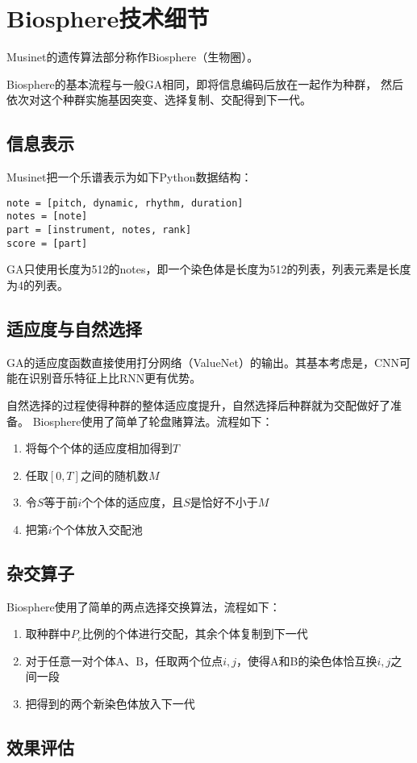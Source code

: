 \documentclass{ctexart}
\begin{document}
\section{Biosphere技术细节}
Musinet的遗传算法部分称作Biosphere（生物圈）。

Biosphere的基本流程与一般GA相同，即将信息编码后放在一起作为种群，
然后依次对这个种群实施基因突变、选择复制、交配得到下一代。

\subsection{信息表示}
Musinet把一个乐谱表示为如下Python数据结构：
\begin{lstlisting}
note = [pitch, dynamic, rhythm, duration]
notes = [note]
part = [instrument, notes, rank]
score = [part]
\end{lstlisting}
GA只使用长度为512的notes，即一个染色体是长度为512的列表，列表元素是长度为4的列表。

\subsection{适应度与自然选择}
GA的适应度函数直接使用打分网络（ValueNet）的输出。其基本考虑是，CNN可能在识别音乐特征上比RNN更有优势。

自然选择的过程使得种群的整体适应度提升，自然选择后种群就为交配做好了准备。
Biosphere使用了简单了轮盘赌算法。流程如下：
\begin{enumerate}[nosep]
  \item 将每个个体的适应度相加得到$T$
  \item 任取$[0,T]$之间的随机数$M$
  \item 令$S$等于前$i$个个体的适应度，且$S$是恰好不小于$M$
  \item 把第$i$个个体放入交配池
\end{enumerate}

\subsection{杂交算子}
Biosphere使用了简单的两点选择交换算法，流程如下：
\begin{enumerate}[nosep]
  \item 取种群中$P_c$比例的个体进行交配，其余个体复制到下一代
  \item 对于任意一对个体A、B，任取两个位点$i,j$，使得A和B的染色体恰互换$i,j$之间一段
  \item 把得到的两个新染色体放入下一代
\end{enumerate}

\subsection{效果评估}
\end{document}
